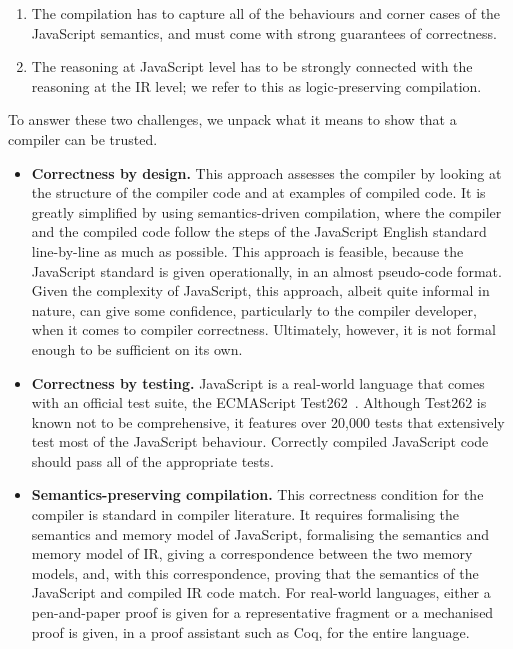 \documentclass{llncs}
\begin{document}
\begin{enumerate}
\setlength{\itemsep}{0.5em}
\item The compilation has to  capture all of the behaviours and corner cases of the JavaScript semantics, and must come with strong guarantees of correctness.
\item The reasoning at JavaScript level has to be strongly connected with the reasoning at the IR level; we refer to this as logic-preserving compilation. 
\end{enumerate}

To answer these two challenges, we unpack what it means
to show that a compiler can be trusted.

\begin{itemize}
\setlength{\itemsep}{0.5em}
\item {\bfseries Correctness by design.} This approach assesses the compiler by looking at the
structure of the compiler code and  at examples of compiled
code. It is greatly simplified by using semantics-driven compilation,
where
the compiler and  the compiled code follow the steps of the JavaScript
English standard line-by-line as much as possible. 
This approach is feasible, because the JavaScript standard is given operationally, in an almost pseudo-code format. Given the complexity of JavaScript, this approach, albeit quite informal in nature, can give some confidence, particularly to the compiler developer, when it comes to compiler correctness. Ultimately, however, it is not formal enough to be sufficient on its own. 

\item {\bfseries Correctness by testing.} JavaScript is a real-world language that
  comes with an official test suite, the ECMAScript
  Test262~\cite{test262}. Although Test262 is known not to be comprehensive,
  it features over 20,000 tests that extensively test
  most of the JavaScript behaviour. 
Correctly compiled JavaScript code should pass all of the appropriate tests.

\item {\bfseries Semantics-preserving compilation.} This correctness
  condition for the compiler is
  standard in compiler literature. It requires formalising the
  semantics and memory model of JavaScript, formalising the semantics
  and memory model of IR, giving a correspondence between the two
  memory models, and, with this correspondence, proving that the
  semantics of the JavaScript and compiled IR code match. For
  real-world languages, either a pen-and-paper proof is given for a
  representative fragment or a mechanised proof is given, in a proof
  assistant such as Coq, for the entire language.


\end{itemize}
\end{document}
